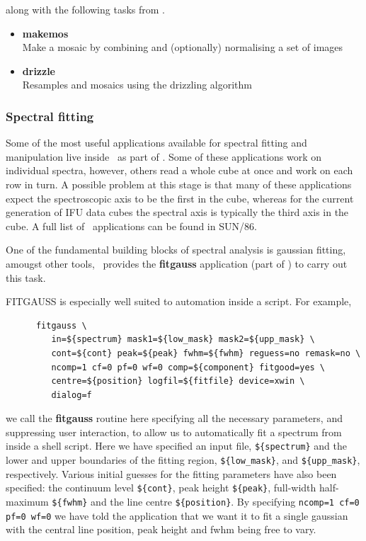 \documentclass[twoside,11pt]{article}
\newcommand{\xref}[3]{#1}
\begin{document}
\begin{\htmlonly}
{along with the following tasks from \CCDPACKref.

\begin{itemize}
\item{\xref{{\bf makemos}}{sun139}{MAKEMOS}}\\
Make a mosaic by combining and (optionally) normalising a set of images 
\item{\xref{{\bf drizzle}}{sun139}{DRIZZLE}}\\
Resamples and mosaics using the drizzling algorithm
\end{itemize}

\subsubsection{Spectral fitting}

Some of the most useful applications available for spectral fitting
and manipulation live inside \FIGAROref\ as part of \SPECDREref.  Some
of these applications work on individual spectra, however, others read
a whole cube at once and work on each row in turn.  A possible problem
at this stage is that many of these applications expect the
spectroscopic axis to be the first in the cube, whereas for the
current generation of IFU data cubes the spectral axis is typically the
third axis in the cube.  A full list of \xref{\SPECDRE\ 
applications}{sun86}{classifspecdre} can be found in SUN/86. 

One of the fundamental building blocks of spectral analysis is
gaussian fitting, amougst other tools, \FIGARO\ provides the
\xref{{\bf fitgauss}}{sun86}{FITGAUSS} application (part of \SPECDRE)
to carry out this task.

FITGAUSS is especially well suited to automation inside a script.
For example,

\small\begin{verbatim}
      fitgauss \
         in=${spectrum} mask1=${low_mask} mask2=${upp_mask} \
         cont=${cont} peak=${peak} fwhm=${fwhm} reguess=no remask=no \
         ncomp=1 cf=0 pf=0 wf=0 comp=${component} fitgood=yes \
         centre=${position} logfil=${fitfile} device=xwin \
         dialog=f 
\end{verbatim}\normalsize

we call the {\bf fitgauss} routine here specifying all the necessary
parameters, and suppressing user interaction, to allow us to
automatically fit a spectrum from inside a shell script.  Here we have
specified an input file, \verb+${spectrum}+ and the lower and upper
boundaries of the fitting region, \verb+${low_mask}+, and
\verb+${upp_mask}+, respectively.  Various initial guesses for the
fitting parameters have also been specified: the continuum level
\verb+${cont}+, peak height \verb+${peak}+, full-width half-maximum
\verb+${fwhm}+ and the line centre \verb+${position}+.  By specifying
\verb+ncomp=1 cf=0 pf=0 wf=0+ we have told the application that we
want it to fit a single gaussian with the central line position, peak
height and fwhm being free to vary.

}
\end{\htmlonly}
\end{document}
